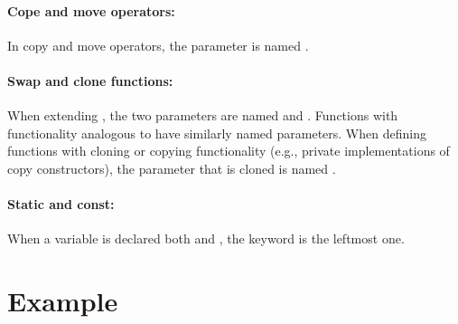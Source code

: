 \documentclass[footinclude=false,11pt,DIV11]{scrartcl}
\begin{document}
\paragraph{Cope and move operators:} In copy and move operators, the parameter 
is named .

\paragraph{Swap and clone functions:} When extending , the two 
parameters are named  and . Functions with 
functionality analogous to  have similarly named parameters. When 
defining functions with cloning or copying functionality (e.g., private 
implementations of copy constructors), the parameter that is cloned is named 
.

\paragraph{Static and const:} When a variable is declared both  and
, the  keyword is the leftmost one.


\section{Example}
\end{document}

